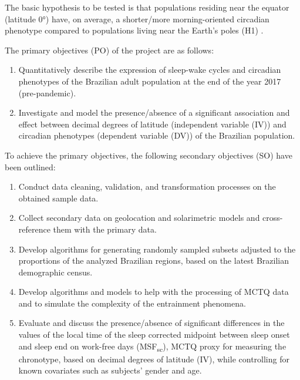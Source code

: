 \documentclass[
12pt,
openright,
oneside,
a4paper,
chapter=TITLE,
section=TITLE,
french,
spanish,
brazil,
english
]{abntex2}\usepackage{array}
\newcommand{\microskip}{\vspace{\microskipamount}}
\begin{document}
The basic hypothesis to be tested is that populations residing near the
equator (latitude 0°) have, on average, a shorter/more morning-oriented
circadian phenotype compared to populations living near the Earth's
poles (H1)
\autocite{hut2013,leocadio-miguel2014,leocadio-miguel2017,pittendrigh1991,randler2008,randler2017,roenneberg2003}.

The primary objectives (PO) of the project are as follows:

\microskip

\begin{enumerate}
\def\labelenumi{\Alph{enumi})}
\item
  Quantitatively describe the expression of sleep-wake cycles and
  circadian phenotypes of the Brazilian adult population at the end of
  the year 2017 (pre-pandemic).
\item
  Investigate and model the presence/absence of a significant
  association and effect between decimal degrees of latitude
  (independent variable (IV)) and circadian phenotypes (dependent
  variable (DV)) of the Brazilian population.
\end{enumerate}

\microskip

To achieve the primary objectives, the following secondary objectives
(SO) have been outlined:

\microskip

\begin{enumerate}
\def\labelenumi{\roman{enumi})}
\item
  Conduct data cleaning, validation, and transformation processes on the
  obtained sample data.
\item
  Collect secondary data on geolocation and solarimetric models and
  cross-reference them with the primary data.
\item
  Develop algorithms for generating randomly sampled subsets adjusted to
  the proportions of the analyzed Brazilian regions, based on the latest
  Brazilian demographic census.
\item
  Develop algorithms and models to help with the processing of MCTQ data
  and to simulate the complexity of the entrainment phenomena.
\item
  Evaluate and discuss the presence/absence of significant differences
  in the values of the local time of the sleep corrected midpoint
  between sleep onset and sleep end on work-free days
  (MSF\textsubscript{sc}), MCTQ proxy for measuring the chronotype,
  based on decimal degrees of latitude (IV), while controlling for known
  covariates such as subjects' gender and age.
\end{enumerate}
\end{document}
